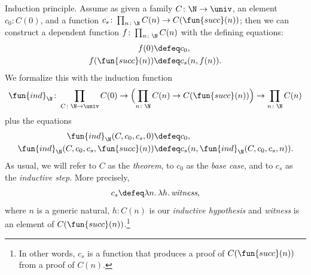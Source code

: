 \begin{lpar}{Induction principle.}\label{lpar:induction-principle}
    Assume as given a family $C\colon\N\to\univ$, an element $c_0\colon C(0)$, and a function $c_s\colon\prod_{n\colon\N} C(n) \to C(\fun{succ}(n))$; then we can construct a dependent function $f\colon\prod_{n\colon\N} C(n)$ with the defining equations:
    \begin{align*}
        f(0) &\defeq c_0,\\
        f(\fun{succ}(n)) &\defeq c_s(n, f(n)).
    \end{align*}
    We formalize this with the induction function
    \[
        \fun{ind}_\N\colon\prod_{C\colon\N\to\univ}
            C(0) \to \Bigl(\prod_{n\colon\N}C(n) \to C(\fun{succ}(n))\Bigr)
            \to \prod_{n\colon\N}C(n)
    \]
    plus the equations
    \begin{align*}
        \fun{ind}_\N(C, c_0, c_s, 0) &\defeq c_0,\\
        \fun{ind}_\N(C, c_0, c_s, \fun{succ}(n)) &\defeq c_s(n, \fun{ind}_\N(C, c_0, c_s, n)).
    \end{align*}
    As usual, we will refer to $C$ as the \textsl{theorem}, to $c_0$ as the \textsl{base case}, and to $c_s$ as the \textsl{inductive step}. More precisely,
    \[
        c_s\defeq\lambda n.\,\lambda h.\,\textit{witness},
    \]
    where $n$ is a generic natural, $h\colon C(n)$ is our \textsl{inductive hypothesis} and \textit{witness} is an element of $C(\fun{succ}(n))$.\footnote{In other words, $c_s$ is a function that produces a proof of $C(\fun{succ}(n))$ from a proof of $C(n)$.}
\end{lpar}

